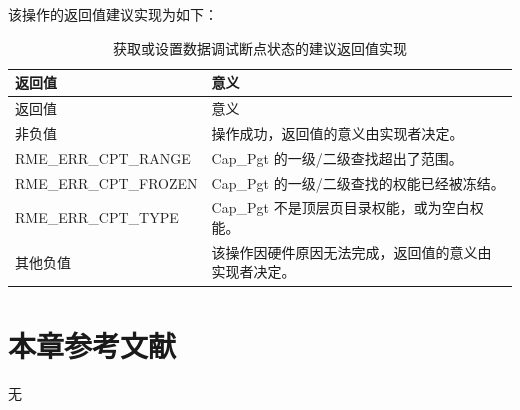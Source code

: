该操作的返回值建议实现为如下：

\begin{xltabular}{\textwidth}{@{}>{\hsize\raggedright\arraybackslash}X>{\hsize\raggedright\arraybackslash}X@{}}
\caption{获取或设置数据调试断点状态的建议返回值实现}\label{tab:8-122-get-or-set-data-breakpoint-state-suggested-return-values}\\
\toprule
返回值 & 意义\tabularnewline
\endfirsthead
\toprule
返回值 & 意义\tabularnewline
\midrule
\endhead
\bottomrule
\endlastfoot
    非负值 & 操作成功，返回值的意义由实现者决定。\tabularnewline
    RME\_ERR\_CPT\_RANGE & Cap\_Pgt 的一级/二级查找超出了范围。\tabularnewline
    RME\_ERR\_CPT\_FROZEN & Cap\_Pgt 的一级/二级查找的权能已经被冻结。\tabularnewline
    RME\_ERR\_CPT\_TYPE & Cap\_Pgt 不是顶层页目录权能，或为空白权能。\tabularnewline
    其他负值 & 该操作因硬件原因无法完成，返回值的意义由实现者决定。\tabularnewline
\end{xltabular}

\section{本章参考文献}\label{sec:8-chapter-bibliography}

无

